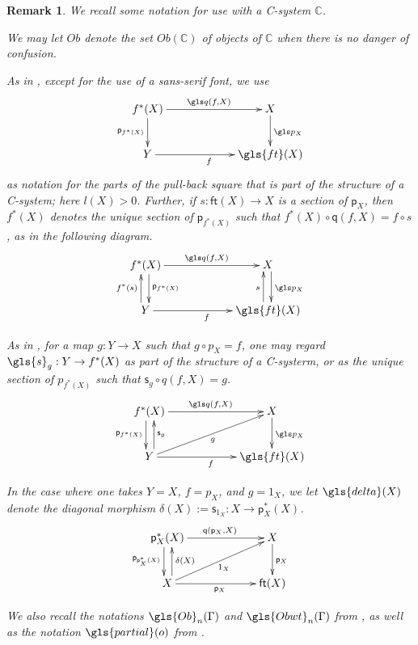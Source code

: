 \documentclass[12pt]{article}
\numberwithin{equation}{section}
\newenvironment{eq}{\begin{equation}}{\end{equation}}
\newtheorem{remark}[proposition]{Remark}
\newcommand{\sr}{\rightarrow}
\newcommand{\CC}{{\mathbb C}}  %
\newcommand{\id}{1}            %
\newcommand{\ft}{\mathsf{ft}}
\newcommand{\p}{\mathsf{p}}
\newcommand{\q}{\mathsf{q}}
\newcommand{\s}{\mathsf{s}}     %
\newcommand{\Ob}{Ob}
\begin{document}
\begin{remark}
  We recall some notation for use with a C-system $\CC$.

  We may let $\Ob$ denote the set $\Ob(\CC)$ of objects of $\CC$ when there is no danger of confusion.

  As in \cite[Def.~2.1 and Prop.~2.4]{Csubsystems}, except for the use of a sans-serif font, we use
  \begin{eq}
    \xymatrix@C=5pc{
      f^*(X) \ar[r]^{\gls q(f,X)} \ar[d]_{\p_{f^*(X)}}  & X \ar[d]^{\gls p_X} \\
      Y \ar[r]_f & \gls{ft}(X)
    }
  \end{eq}%
  as notation for the parts of the pull-back square that is part of the
  structure of a C-system; here $l(X) > 0$.
  Further, if $s : \ft(X) \sr X$ is a section of $\p_X$, then $f^*(X)$ denotes
  the unique section of $\p_{f^*(X)}$ such that $f^*(X) \circ \q(f,X) = f \circ
  s$, as in the following diagram.
  \begin{eq}
    \xymatrix@C=5pc{
      f^*(X) \ar[r]^{\gls q(f,X)} \ar@<3pt>[d]^{\p_{f^*(X)}}  & X \ar@<3pt>[d]^{\gls p_X} \\
      Y \ar[r]_f \ar@<4pt>[u]^{f^*(s)} & \gls{ft}(X) \ar@<4pt>[u]^s
    }
  \end{eq}%

  As in \cite[Def.~2.3 and Prop.~2.4]{Csubsystems}, for a map $g : Y \sr X$
  such that $g \circ p_X = f$, one may regard
  $\gls{s}_g : Y \sr f^*(X)$ as part of the structure of a C-systerm, or
  as the unique section of $p_{f^*(X)}$ such that $\s_g \circ q(f,X) = g$.
  $$
    \xymatrix@C=5pc{
      f^*(X) \ar[r]^{\gls q(f,X)} \ar@<-3pt>[d]_{\p_{f^*(X)}} & X \ar[d]^{\gls p_X} \\
      Y \ar[ru]_g \ar[r]_f \ar@<-4pt>[u]_{\s_g} & \gls{ft}(X)
    }
  $$

  In the case where one takes $Y=X$, $f=p_X$, and $g = 1_X$, we let $\gls{delta}(X)$ denote
  the diagonal morphism $\delta(X) := \s_{\id_X} : X\sr \p_X^*(X)$.
  \begin{eq}
    \xymatrix@C=5pc{
      \p_X^*(X) \ar[r]^{\q(\p_X,X)} \ar@<-3pt>[d]_{\p_{\p_X^*(X)}} & X \ar[d]^{\p_X} \\
      X \ar[ru]_{1_X} \ar[r]_{\p_X} \ar@<-4pt>[u]_{\delta(X)} & \ft(X)
    }
  \end{eq}

  We also recall the notations ${\gls{Ob}}_n(\Gamma)$ and
  $\gls{Obwt}_n(\Gamma)$ from \cite[\S 3]{fromunivwithPiI}, as well as the
  notation $\gls{partial}(o)$ from \cite[\S 3]{Csubsystems}.


\end{remark}
\end{document}

